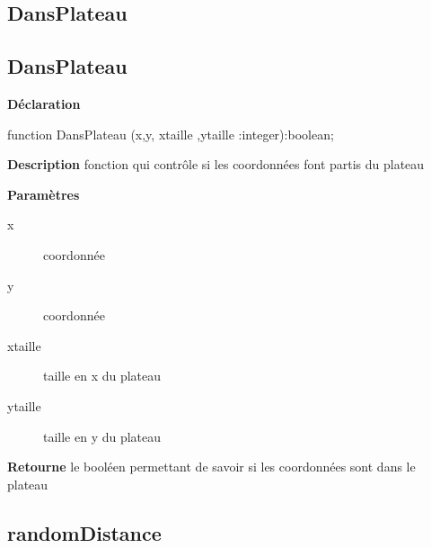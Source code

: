 \documentclass{report}
\newif\ifpdf
\begin{document}
\subsection*{\large{\textbf{DansPlateau}}\normalsize\hspace{1ex}\hrulefill}
\else
\subsection*{DansPlateau}
\fi
\label{Generation-DansPlateau}
\begin{list}{}{
\setlength{\itemindent}{0cm}
\setlength{\listparindent}{0cm}
\setlength{\leftmargin}{\evensidemargin}
\addtolength{\leftmargin}{\tmplength}
\settowidth{\labelsep}{X}
\addtolength{\leftmargin}{\labelsep}
\setlength{\labelwidth}{\tmplength}
}
\item[\textbf{Déclaration}\hfill]
\ifpdf
\begin{flushleft}
\fi
\begin{ttfamily}
function DansPlateau (x,y, xtaille ,ytaille :integer):boolean;\end{ttfamily}

\ifpdf
\end{flushleft}
\fi

\par
\item[\textbf{Description}]
fonction qui contrôle si les coordonnées font partis du plateau     \par
\item[\textbf{Paramètres}]
\begin{description}
\item[x] coordonnée
\item[y] coordonnée
\item[xtaille] taille en x du plateau
\item[ytaille] taille en y du plateau
\end{description}
\item[\textbf{Retourne}]le booléen permettant de savoir si les coordonnées sont dans le plateau


\end{list}
\ifpdf
\subsection*{\large{\textbf{randomDistance}}\normalsize\hspace{1ex}\hrulefill}
\else
\end{document}

